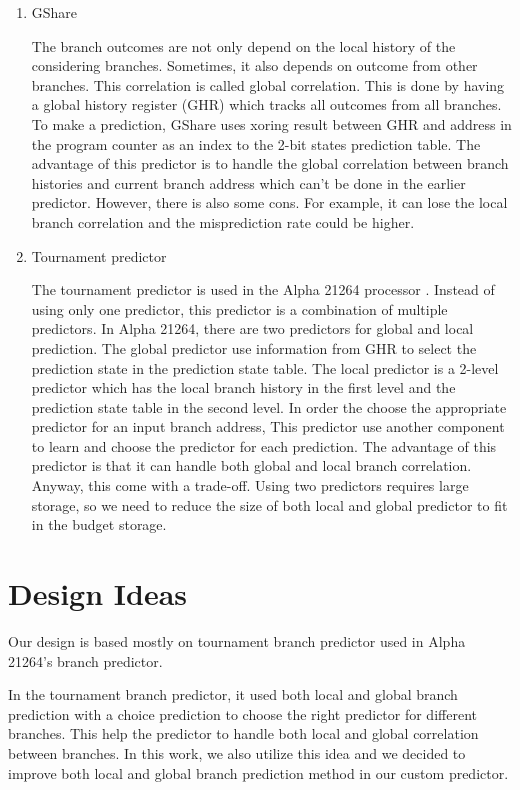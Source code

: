 \documentclass[conference]{IEEEtran}
\begin{document}
\begin{enumerate}
  \item GShare

  The branch outcomes are not only depend on the local history of the considering
  branches. Sometimes, it also depends on outcome from other branches. This correlation
  is called global correlation. This is done by having a global history register (GHR) which
  tracks all outcomes from all branches. To make a prediction, GShare uses xoring result
  between GHR and address in the program counter as an index to the 2-bit states prediction table. 
  The advantage of this predictor is to handle the global correlation between branch histories and
  current branch address which can't be done in the earlier predictor. However, there is also some
  cons. For example, it can lose the local branch correlation and the misprediction rate
  could be higher.

  \item Tournament predictor

  The tournament predictor is used in the Alpha 21264 processor \cite{Alpha21264}. Instead of using only one predictor,
  this predictor is a combination of multiple predictors. In Alpha 21264, there are two predictors for
  global and local prediction. The global predictor use information from GHR to select the prediction state
  in the prediction state table. The local predictor is a 2-level predictor which has the local branch history
  in the first level and the prediction state table in the second level. In order the choose the appropriate
  predictor for an input branch address, This predictor use another component to learn and choose the predictor
  for each prediction. The advantage of this predictor is that it can handle both global and local branch correlation.
  Anyway, this come with a trade-off. Using two predictors requires large storage, so we need to reduce the size of
  both local and global predictor to fit in the budget storage.

\end{enumerate}

\section{Design Ideas}

Our design is based mostly on tournament branch predictor used in Alpha 21264's branch
predictor.

In the tournament branch predictor, it used both local and global branch prediction
with a choice prediction to choose the right predictor for different branches.
This help the predictor to handle both local and global correlation between branches.
In this work, we also utilize this idea and we decided to improve both local and global
branch prediction method in our custom predictor.
\end{document}
